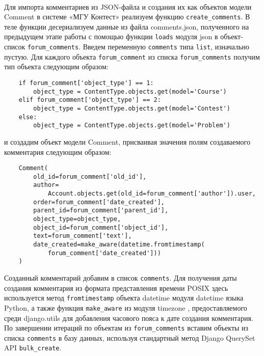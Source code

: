 \documentclass[12pt, a4paper, oneside]{article}
\begin{document}
\paragraph{}
Для импорта комментариев из JSON-файла и создания их как объектов модели Comment в системе «МГУ Контест» реализуем функцию \texttt{create\_comments}. В теле функции десериализуем данные из файла comments.json, полученного на предыдущем этапе работы с помощью функции \texttt{loads} модуля json в объект-список \texttt{forum\_comments}. Введем переменную \texttt{comments} типа \texttt{list}, изначально пустую. Для каждого объекта \texttt{forum\_comment} из списка \texttt{forum\_comments} получим тип объекта следующим образом:
\begin{verbatim}
    if forum_comment['object_type'] == 1:
        object_type = ContentType.objects.get(model='Course')
    elif forum_comment['object_type'] == 2:
        object_type = ContentType.objects.get(model='Contest')
    else:
        object_type = ContentType.objects.get(model='Problem')
\end{verbatim}
и создадим объект модели Comment, присваивая значения полям создаваемого комментария следующим образом:
\begin{verbatim}
    Comment(
        old_id=forum_comment['old_id'],
        author=
            Account.objects.get(old_id=forum_comment['author']).user,
        order=forum_comment['date_created'],
        parent_id=forum_comment['parent_id'],
        object_type=object_type,
        object_id=forum_comment['object_id'],
        text=forum_comment['text'],
        date_created=make_aware(datetime.fromtimestamp(
            forum_comment['date_created']))
    )
\end{verbatim}
Созданный комментарий добавим в список \texttt{comments}. Для получения даты создания комментария из формата представления времени POSIX здесь используется метод \texttt{fromtimestamp} объекта datetime модуля datetime языка Python, а также функция \texttt{make\_aware} из модуля timezone \cite{django-timezone}, предоставляемого среди django.utils для добавления часового пояса к дате создания комментария. По завершении итераций по объектам из \texttt{forum\_comments} вставим объекты из списка \texttt{comments} в базу данных, используя стандартный метод Django QuerySet API \texttt{bulk\_create}.
\end{document}
